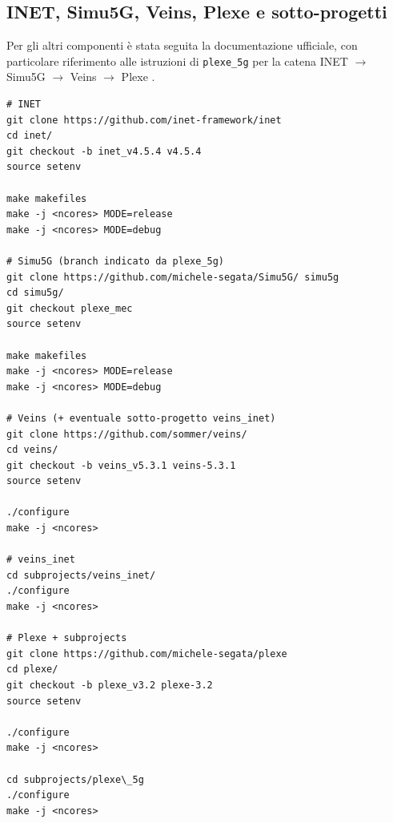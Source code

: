 \subsection{INET, Simu5G, Veins, Plexe e sotto-progetti}

Per gli altri componenti è stata seguita la documentazione ufficiale, con particolare riferimento alle istruzioni di \texttt{plexe\_5g} per la catena INET $\rightarrow$ Simu5G $\rightarrow$ Veins $\rightarrow$ Plexe \cite{plexe_5g_readme,plexe_building}.

\begin{lstlisting}[caption={Sequenza di compilazione dei framework OMNeT++ based},label={lst:framework_build}]
# INET
git clone https://github.com/inet-framework/inet
cd inet/
git checkout -b inet_v4.5.4 v4.5.4
source setenv

make makefiles
make -j <ncores> MODE=release
make -j <ncores> MODE=debug

# Simu5G (branch indicato da plexe_5g)
git clone https://github.com/michele-segata/Simu5G/ simu5g
cd simu5g/
git checkout plexe_mec
source setenv

make makefiles
make -j <ncores> MODE=release
make -j <ncores> MODE=debug

# Veins (+ eventuale sotto-progetto veins_inet)
git clone https://github.com/sommer/veins/
cd veins/
git checkout -b veins_v5.3.1 veins-5.3.1
source setenv

./configure
make -j <ncores>

# veins_inet
cd subprojects/veins_inet/
./configure
make -j <ncores>

# Plexe + subprojects
git clone https://github.com/michele-segata/plexe
cd plexe/
git checkout -b plexe_v3.2 plexe-3.2
source setenv

./configure
make -j <ncores>

cd subprojects/plexe\_5g
./configure
make -j <ncores>

\end{lstlisting}
